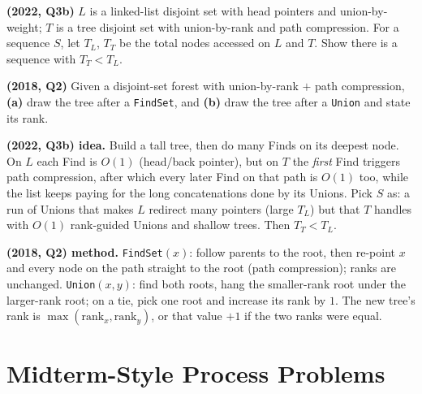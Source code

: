 \documentclass[11pt]{article}
\begin{document}
\begin{exambox}
\textbf{(2022, Q3b)} $L$ is a linked-list disjoint set with head pointers and union-by-weight; $T$ is a tree disjoint set with union-by-rank and path compression. For a sequence $S$, let $T_L$, $T_T$ be the total nodes accessed on $L$ and $T$. Show there is a sequence with $T_T < T_L$.

\textbf{(2018, Q2)} Given a disjoint-set forest with union-by-rank $+$ path compression, \textbf{(a)} draw the tree after a \texttt{FindSet}, and \textbf{(b)} draw the tree after a \texttt{Union} and state its rank.

\begin{answerband}
\textbf{(2022, Q3b) idea.} Build a tall tree, then do many Finds on its deepest node. On $L$ each Find is $O(1)$ (head/back pointer), but on $T$ the \emph{first} Find triggers path compression, after which every later Find on that path is $O(1)$ too, while the list keeps paying for the long concatenations done by its Unions. Pick $S$ as: a run of Unions that makes $L$ redirect many pointers (large $T_L$) but that $T$ handles with $O(1)$ rank-guided Unions and shallow trees. Then $T_T < T_L$.

\smallskip
\textbf{(2018, Q2) method.} \texttt{FindSet}$(x)$: follow parents to the root, then re-point $x$ and every node on the path straight to the root (path compression); ranks are unchanged. \texttt{Union}$(x,y)$: find both roots, hang the smaller-rank root under the larger-rank root; on a tie, pick one root and increase its rank by $1$. The new tree's rank is $\max(\text{rank}_x,\text{rank}_y)$, or that value $+1$ if the two ranks were equal.
\end{answerband}
\end{exambox}

\section{Midterm-Style Process Problems}
\end{document}
